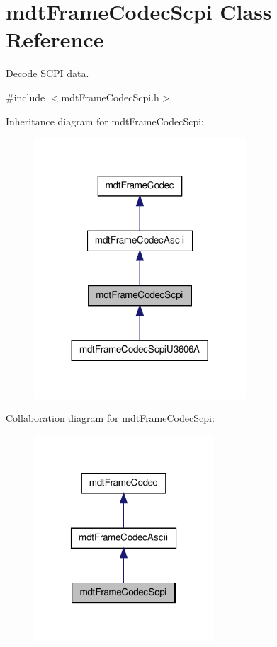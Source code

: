 \hypertarget{classmdt_frame_codec_scpi}{
\section{mdtFrameCodecScpi Class Reference}
\label{classmdt_frame_codec_scpi}
}


Decode SCPI data.  




{\ttfamily \#include $<$mdtFrameCodecScpi.h$>$}



Inheritance diagram for mdtFrameCodecScpi:\nopagebreak
\begin{figure}[H]
\begin{center}
\leavevmode
\includegraphics[width=224pt]{classmdt_frame_codec_scpi__inherit__graph}
\end{center}
\end{figure}


Collaboration diagram for mdtFrameCodecScpi:\nopagebreak
\begin{figure}[H]
\begin{center}
\leavevmode
\includegraphics[width=190pt]{classmdt_frame_codec_scpi__coll__graph}
\end{center}
\end{figure}
